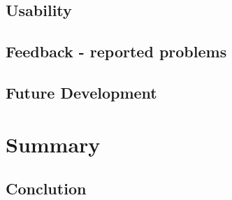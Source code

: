 \documentclass[BSP,english,oneside]{classes/gucthesis}
\begin{document}
	\section{Usability}
		\label{sec:usability}
		

	\section{Feedback - reported problems}
		\label{sec:feedback}
		

	\section{Future Development}
		\label{sec:future_development}
		


\chapter{Summary}
	\label{chap:summary}

	\section{Conclution}
		\label{sec:conclution}
		
		
\printnoidxglossary[sort=word]







\label{STOP_SUMMARY_PAGECOUNT}

\clearpage
\appendix %
\addappheadtotoc
\appendixpage


\clearpage
{}
\addtocounter{chapter}{1}

\end{document}
